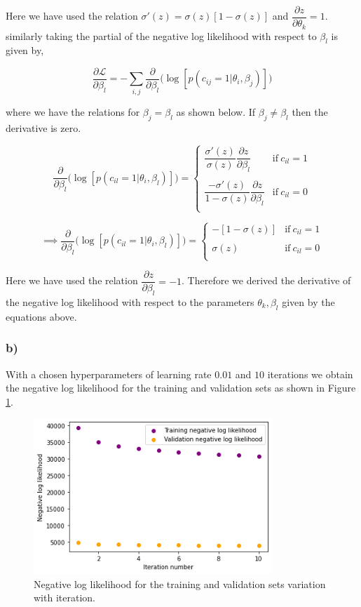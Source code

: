 \documentclass{article}
\begin{document}
Here we have used the relation $\sigma'(z)=\sigma(z)[1-\sigma(z)]$ and $\dfrac{\partial z}{\partial \theta_k}=1$. similarly taking the partial of the negative log likelihood with respect to $\beta_l$ is given by,

$$\dfrac{\partial \mathcal{L}}{\partial \beta_l}= -\sum_{i,j}\dfrac{\partial}{\partial \beta_l}\Big(\log[p(c_{ij}=1|\theta_i, \beta_j)]\Big)$$

where we have the relations for $\beta_j=\beta_l$ as shown below. If $\beta_j\neq \beta_l$ then the derivative is zero.

$$\dfrac{\partial}{\partial \beta_l}\Big(\log[p(c_{il}=1|\theta_i, \beta_l)]\Big)=
\begin{cases}
\dfrac{\sigma'(z)}{\sigma(z)}\dfrac{\partial z}{\partial \beta_l} &\text{if}\ c_{il}=1\\
\\
\dfrac{-\sigma'(z)}{1-\sigma(z)}\dfrac{\partial z}{\partial \beta_l} &\text{if}\ c_{il}=0\\
\end{cases}$$

$$\implies \dfrac{\partial}{\partial \beta_l}\Big(\log[p(c_{il}=1|\theta_i, \beta_l)]\Big)=
\begin{cases}
-[1-\sigma(z)] &\text{if}\ c_{il}=1\\
\\
\sigma(z) &\text{if}\ c_{il}=0\\
\end{cases}$$

Here we have used the relation $\dfrac{\partial z}{\partial \beta_l}=-1$. Therefore we derived the derivative of the negative log likelihood with respect to the parameters $\theta_k, \beta_l$ given by the equations above.

\subsubsection*{b)}
With a chosen hyperparameters of learning rate $0.01$ and $10$ iterations we obtain the negative log likelihood for the training and validation sets as shown in Figure \ref{fig:nnlk}.

\begin{figure}[H]
    \centering
    \includegraphics[width=9cm]{nnlk item response.png}
    \caption{Negative log likelihood for the training and validation sets variation with iteration.}
    \label{fig:nnlk}
\end{figure}
\end{document}
